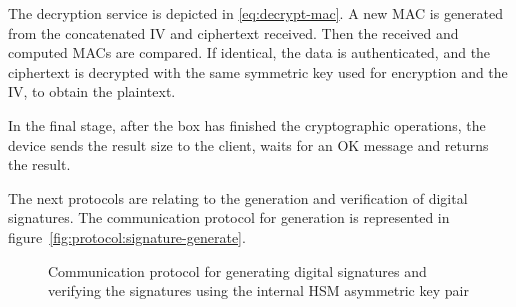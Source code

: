 The decryption service is depicted in \ref{eq:decrypt-mac}.
A new \ac{MAC} is generated from the concatenated \ac{IV} and ciphertext received. Then the received and computed {MAC}s are compared. If identical, the data is authenticated, and the ciphertext is decrypted with the same symmetric key used for encryption and the \ac{IV}, to obtain the plaintext.

In the final stage, after the box has finished the cryptographic operations, the device sends the result size to the client, waits for an OK message and returns the result.

\hfill
\hfill

The next protocols are relating to the generation and verification of digital signatures.
The communication protocol for generation is represented in figure~\ref{fig:protocol:signature-generate}.

\begin{figure}[h!]
	\centering     %
	\caption{Communication protocol for generating digital signatures and verifying the signatures using the internal HSM asymmetric key pair}
\end{figure}


